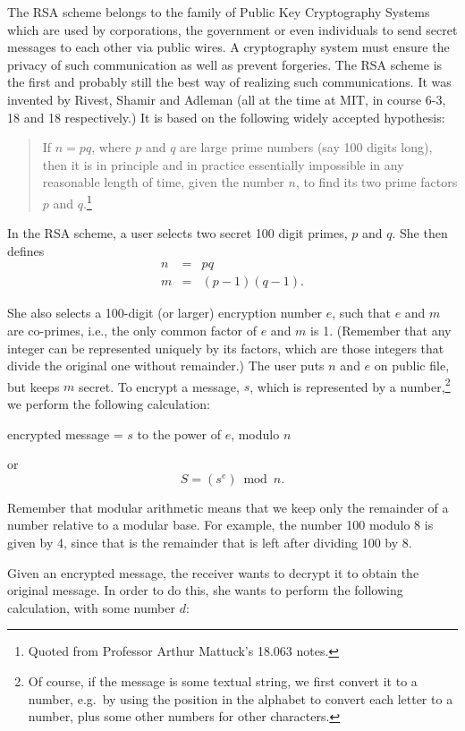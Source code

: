 The RSA scheme belongs to the family of Public Key Cryptography Systems which
are used by corporations, the government or even individuals to send secret
messages to each other via public wires.  A cryptography system must ensure
the privacy of such communication as well as prevent forgeries.
The RSA scheme is the first and probably still the best way of realizing such
communications.  It was invented by Rivest, Shamir and Adleman (all at the
time at MIT, in course 6-3, 18 and 18 respectively.)  It is based on the
following widely accepted hypothesis:

\begin{quote}
If $n=pq$, where $p$ and $q$ are large prime numbers (say 100 digits
long), then it is in principle and in practice essentially impossible
in any reasonable length of time, given the number $n$, to find its
two prime factors $p$ and $q$.\footnote{Quoted from Professor Arthur
Mattuck's 18.063 notes.} 
\end{quote}

In the RSA scheme, a user selects two secret 100 digit primes, $p$ and $q$.
She then defines
\begin{eqnarray*}
n&=& pq\\
m&=&(p - 1)(q - 1).
\end{eqnarray*}

She also selects a 100-digit (or larger) encryption number $e$, such
that $e$ and $m$ are co-primes, i.e., the only common factor of $e$
and $m$ is 1.  (Remember that any integer can be represented uniquely
by its factors, which are those integers that divide the original one
without remainder.)  The user puts $n$ and $e$ on public file, but
keeps $m$ secret.  To encrypt a message, $s$, which is represented by
a number,\footnote{Of course, if the message is some textual string, we
first convert it to a number, e.g.~by using the position in the
alphabet to convert each letter to a number, plus some other numbers
for other characters.} we perform the following calculation:

\smallskip
\centerline{encrypted message = $s$ to the power of $e$, modulo $n$}
or 
\[S = (s^e) \bmod n.\]

Remember that modular arithmetic means that we keep only the remainder
of a number relative to a modular base.  For example, the number 100
modulo 8 is given by 4, since that is the remainder that is left after
dividing 100 by 8.

Given an encrypted message, the receiver wants to decrypt it to obtain
the original message.  In order to do this, she wants to
perform the following calculation, with some number $d$:

